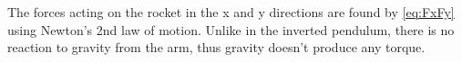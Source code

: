 		
		The forces acting on the rocket in the x and y directions are found by \autoref{eq:FxFy} using Newton's 2nd law of motion. Unlike in the inverted pendulum, there is no reaction to gravity from the arm, thus gravity doesn't produce any torque.
		

